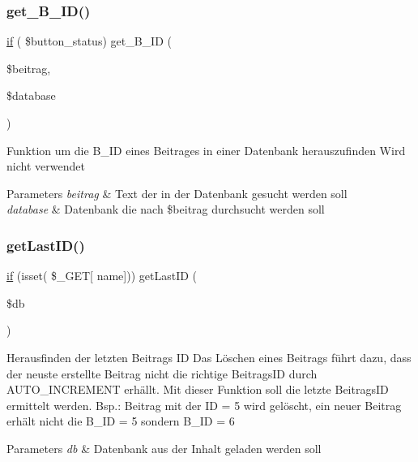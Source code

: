\subsubsection{\texorpdfstring{get\_B\_ID()}{get\_B\_ID()}}
{\footnotesize\ttfamily \mbox{\hyperlink{view__all_8php_ac0971e25a4f61580752c758ef520f6b2}{if}} ( \$button\+\_\+status) get\+\_\+\+B\+\_\+\+ID (\begin{DoxyParamCaption}\item[{}]{\$beitrag,  }\item[{}]{\$database }\end{DoxyParamCaption})}

Funktion um die B\+\_\+\+ID eines Beitrages in einer Datenbank herauszufinden Wird nicht verwendet 
\begin{DoxyParams}{Parameters}
{\em beitrag} & Text der in der Datenbank gesucht werden soll \\
\hline
{\em database} & Datenbank die nach \$beitrag durchsucht werden soll \\
\hline
\end{DoxyParams}
\mbox{\label{article_8php_ae43551f2fe671754d63f6ac76df2678a}} 
\subsubsection{\texorpdfstring{getLastID()}{getLastID()}}
{\footnotesize\ttfamily \mbox{\hyperlink{view__all_8php_ac0971e25a4f61580752c758ef520f6b2}{if}} (isset( \$\+\_\+\+G\+ET\mbox{[} \textquotesingle{}name\textquotesingle{}\mbox{]})) get\+Last\+ID (\begin{DoxyParamCaption}\item[{}]{\$db }\end{DoxyParamCaption})}

Herausfinden der letzten Beitrags ID Das Löschen eines Beitrags führt dazu, dass der neuste erstellte Beitrag nicht die richtige Beitrags\+ID durch A\+U\+T\+O\+\_\+\+I\+N\+C\+R\+E\+M\+E\+NT erhällt. Mit dieser Funktion soll die letzte Beitrags\+ID ermittelt werden. Bsp.\+: Beitrag mit der ID = 5 wird gelöscht, ein neuer Beitrag erhält nicht die B\+\_\+\+ID = 5 sondern B\+\_\+\+ID = 6


\begin{DoxyParams}{Parameters}
{\em db} & Datenbank aus der Inhalt geladen werden soll \\
\hline
\end{DoxyParams}


